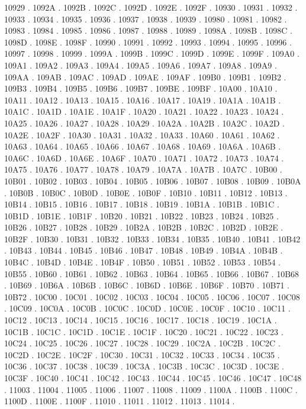 10929 .
1092A .
1092B .
1092C .
1092D .
1092E .
1092F .
10930 .
10931 .
10932 .
10933 .
10934 .
10935 .
10936 .
10937 .
10938 .
10939 .
10980 .
10981 .
10982 .
10983 .
10984 .
10985 .
10986 .
10987 .
10988 .
10989 .
1098A .
1098B .
1098C .
1098D .
1098E .
1098F .
10990 .
10991 .
10992 .
10993 .
10994 .
10995 .
10996 .
10997 .
10998 .
10999 .
1099A .
1099B .
1099C .
1099D .
1099E .
1099F .
109A0 .
109A1 .
109A2 .
109A3 .
109A4 .
109A5 .
109A6 .
109A7 .
109A8 .
109A9 .
109AA .
109AB .
109AC .
109AD .
109AE .
109AF .
109B0 .
109B1 .
109B2 .
109B3 .
109B4 .
109B5 .
109B6 .
109B7 .
109BE .
109BF .
10A00 .
10A10 .
10A11 .
10A12 .
10A13 .
10A15 .
10A16 .
10A17 .
10A19 .
10A1A .
10A1B .
10A1C .
10A1D .
10A1E .
10A1F .
10A20 .
10A21 .
10A22 .
10A23 .
10A24 .
10A25 .
10A26 .
10A27 .
10A28 .
10A29 .
10A2A .
10A2B .
10A2C .
10A2D .
10A2E .
10A2F .
10A30 .
10A31 .
10A32 .
10A33 .
10A60 .
10A61 .
10A62 .
10A63 .
10A64 .
10A65 .
10A66 .
10A67 .
10A68 .
10A69 .
10A6A .
10A6B .
10A6C .
10A6D .
10A6E .
10A6F .
10A70 .
10A71 .
10A72 .
10A73 .
10A74 .
10A75 .
10A76 .
10A77 .
10A78 .
10A79 .
10A7A .
10A7B .
10A7C .
10B00 .
10B01 .
10B02 .
10B03 .
10B04 .
10B05 .
10B06 .
10B07 .
10B08 .
10B09 .
10B0A .
10B0B .
10B0C .
10B0D .
10B0E .
10B0F .
10B10 .
10B11 .
10B12 .
10B13 .
10B14 .
10B15 .
10B16 .
10B17 .
10B18 .
10B19 .
10B1A .
10B1B .
10B1C .
10B1D .
10B1E .
10B1F .
10B20 .
10B21 .
10B22 .
10B23 .
10B24 .
10B25 .
10B26 .
10B27 .
10B28 .
10B29 .
10B2A .
10B2B .
10B2C .
10B2D .
10B2E .
10B2F .
10B30 .
10B31 .
10B32 .
10B33 .
10B34 .
10B35 .
10B40 .
10B41 .
10B42 .
10B43 .
10B44 .
10B45 .
10B46 .
10B47 .
10B48 .
10B49 .
10B4A .
10B4B .
10B4C .
10B4D .
10B4E .
10B4F .
10B50 .
10B51 .
10B52 .
10B53 .
10B54 .
10B55 .
10B60 .
10B61 .
10B62 .
10B63 .
10B64 .
10B65 .
10B66 .
10B67 .
10B68 .
10B69 .
10B6A .
10B6B .
10B6C .
10B6D .
10B6E .
10B6F .
10B70 .
10B71 .
10B72 .
10C00 .
10C01 .
10C02 .
10C03 .
10C04 .
10C05 .
10C06 .
10C07 .
10C08 .
10C09 .
10C0A .
10C0B .
10C0C .
10C0D .
10C0E .
10C0F .
10C10 .
10C11 .
10C12 .
10C13 .
10C14 .
10C15 .
10C16 .
10C17 .
10C18 .
10C19 .
10C1A .
10C1B .
10C1C .
10C1D .
10C1E .
10C1F .
10C20 .
10C21 .
10C22 .
10C23 .
10C24 .
10C25 .
10C26 .
10C27 .
10C28 .
10C29 .
10C2A .
10C2B .
10C2C .
10C2D .
10C2E .
10C2F .
10C30 .
10C31 .
10C32 .
10C33 .
10C34 .
10C35 .
10C36 .
10C37 .
10C38 .
10C39 .
10C3A .
10C3B .
10C3C .
10C3D .
10C3E .
10C3F .
10C40 .
10C41 .
10C42 .
10C43 .
10C44 .
10C45 .
10C46 .
10C47 .
10C48 .
11003 .
11004 .
11005 .
11006 .
11007 .
11008 .
11009 .
1100A .
1100B .
1100C .
1100D .
1100E .
1100F .
11010 .
11011 .
11012 .
11013 .
11014 .

